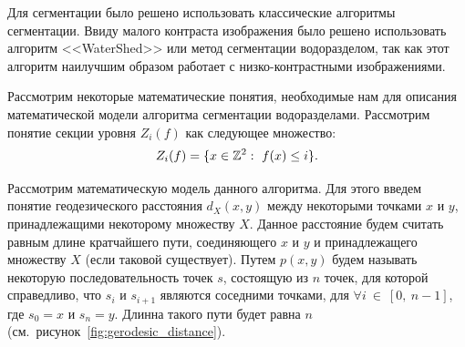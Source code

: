 \documentclass[14pt, a4paper]{extreport}
\begin{document}
	Для сегментации было решено использовать классические алгоритмы сегментации. Ввиду малого контраста изображения было решено использовать алгоритм <<WaterShed>> или метод сегментации водоразделом, так как этот алгоритм наилучшим образом работает с низко-контрастными изображениями.
	
	Рассмотрим некоторые математические понятия, необходимые нам для описания математической модели алгоритма сегментации водоразделами. Рассмотрим понятие секции уровня $Z_i(f)$ как следующее множество:\vspace*{-0.3cm}
	\begin{equation*}
		Z_i(f) = \{x\in \mathbb{Z}^2:~f(x)\le i\}.
		\vspace*{-0.3cm}
		\label{Z_i(f)}
	\end{equation*}
	
	Рассмотрим математическую модель данного алгоритма. Для этого введем понятие геодезического расстояния $d_X(x,y)$ между некоторыми точками $x$ и $y$, принадлежащими некоторому множеству $X$. Данное расстояние будем считать равным длине кратчайшего пути, соединяющего $x$ и $y$ и принадлежащего множеству $X$ (если таковой существует). Путем $p(x,y)$ будем называть некоторую последовательность точек $s$, состоящую из $n$ точек, для которой справедливо, что $s_i$ и $s_{i+1}$ являются соседними точками, для $\forall i~\in~[0,~n-1]$, где $s_0 = x$ и $s_n = y$. Длинна такого пути будет равна $n$ (см.~рисунок~\ref{fig:gerodesic_distance}).
	
\end{document}
